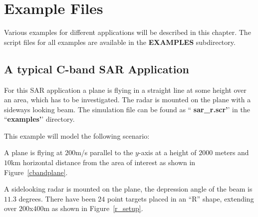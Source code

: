                       

\chapter{Example Files\label{chapter:examples}}

Various examples for different applications will be described in this
chapter. The script files for all examples are available in the \textbf{%
EXAMPLES} subdirectory.

\section{A typical C-band SAR Application}

For this SAR application a plane is flying in a straight line at some height
over an area, which has to be investigated. The radar is mounted on the
plane with a sideways looking beam. The simulation file can be found as ``%
\textbf{sar\_r.scr'}' in the ``\textbf{examples'}' directory.

This example will model the following scenario:

A plane is flying at $200$\thinspace m/s parallel to the $y$-axis at a
height of $2000$ meters and $10$\thinspace km horizontal distance from the
area of interest as shown in Figure~\ref{cbandplane}.


A sidelooking radar is mounted on the plane, the depression angle of the
beam is $11.3$ degrees. There have been $24$ point targets placed in an
``R'' shape, extending over $200$\thinspace x\thinspace $400$\thinspace m as
shown in Figure~\ref{r_setup}.



